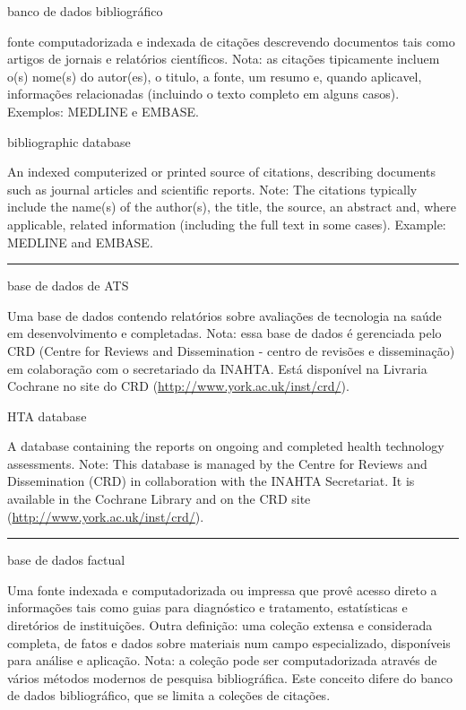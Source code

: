 \documentclass[
  openany]{book}
\begin{document}
banco de dados bibliográfico

fonte computadorizada e indexada de citações descrevendo documentos tais como artigos de jornais e relatórios científicos. Nota: as citações tipicamente incluem o(s) nome(s) do autor(es), o titulo, a fonte, um resumo e, quando aplicavel, informações relacionadas (incluindo o texto completo em alguns casos). Exemplos: MEDLINE e EMBASE.

bibliographic database

An indexed computerized or printed source of citations, describing documents such as journal articles and scientific reports. Note: The citations typically include the name(s) of the author(s), the title, the source, an abstract and, where applicable, related information (including the full text in some cases). Example: MEDLINE and EMBASE.

\begin{center}\rule{0.5\linewidth}{0.5pt}\end{center}

base de dados de ATS

Uma base de dados contendo relatórios sobre avaliações de tecnologia na saúde em desenvolvimento e completadas. Nota: essa base de dados é gerenciada pelo CRD (Centre for Reviews and Dissemination - centro de revisões e disseminação) em colaboração com o secretariado da INAHTA. Está disponível na Livraria Cochrane no site do CRD (\url{http://www.york.ac.uk/inst/crd/}).

HTA database

A database containing the reports on ongoing and completed health technology assessments. Note: This database is managed by the Centre for Reviews and Dissemination (CRD) in collaboration with the INAHTA Secretariat. It is available in the Cochrane Library and on the CRD site (\url{http://www.york.ac.uk/inst/crd/}).

\begin{center}\rule{0.5\linewidth}{0.5pt}\end{center}

base de dados factual

Uma fonte indexada e computadorizada ou impressa que provê acesso direto a informações tais como guias para diagnóstico e tratamento, estatísticas e diretórios de instituições. Outra definição: uma coleção extensa e considerada completa, de fatos e dados sobre materiais num campo especializado, disponíveis para análise e aplicação. Nota: a coleção pode ser computadorizada através de vários métodos modernos de pesquisa bibliográfica. Este conceito difere do banco de dados bibliográfico, que se limita a coleções de citações.
\end{document}
